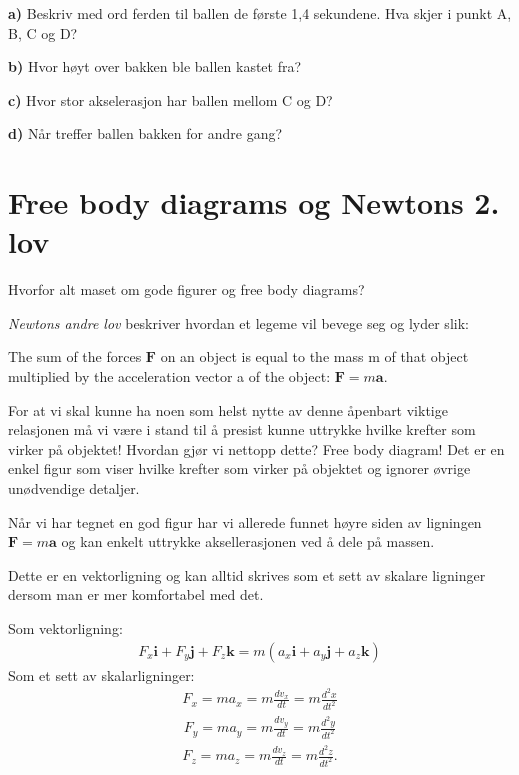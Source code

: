 \documentclass[11pt,a4paper]{article}
\numberwithin{equation}{section}
\begin{document}
\textbf{a)} Beskriv med ord ferden til ballen de første 1,4 sekundene. Hva skjer i punkt A, B, C og D?

\textbf{b)} Hvor høyt over bakken ble ballen kastet fra?

\textbf{c)} Hvor stor akselerasjon har ballen mellom C og D?

\textbf{d)} Når treffer ballen bakken for andre gang?   

\newpage

\section{Free body diagrams og Newtons 2. lov}
Hvorfor alt maset om gode figurer og free body diagrams?

\emph{Newtons andre lov} beskriver hvordan et legeme vil bevege seg og lyder slik: 

\begin{tcolorbox}
The sum of the forces $\mathbf{F}$ on an object is equal to the mass m of that object multiplied by the acceleration vector a of the object: $\mathbf{F} = m\mathbf{a}$.
\end{tcolorbox} 

For at vi skal kunne ha noen som helst nytte av denne åpenbart viktige relasjonen må vi være i stand til å presist kunne uttrykke hvilke krefter som virker på objektet! Hvordan gjør vi nettopp dette? Free body diagram! Det er en enkel figur som viser hvilke krefter som virker på objektet og ignorer øvrige unødvendige detaljer.

Når vi har tegnet en god figur har vi allerede funnet høyre siden av ligningen $\mathbf{F} = m\mathbf{a}$ og kan enkelt uttrykke aksellerasjonen ved å dele på massen. 

Dette er en vektorligning og kan alltid skrives som et sett av skalare ligninger dersom man er mer komfortabel med det.

Som vektorligning:
\begin{align*}
F_x \mathbf{i} + F_y \mathbf{j} + F_z \mathbf{k}= m( a_x \mathbf{i} + a_y \mathbf{j} + a_z \mathbf{k})
\end{align*}
Som et sett av skalarligninger:
\begin{align*}\tag{2.x}
F_x = ma_x = m \frac{dv_x}{dt} = m\frac{d^2x}{dt^2}
\end{align*}
\begin{align*}\tag{2.y}
F_y = ma_y = m \frac{dv_y}{dt} = m\frac{d^2y}{dt^2}
\end{align*}
\begin{align*}\tag{2.z}
F_z = ma_z = m \frac{dv_z}{dt} = m\frac{d^2z}{dt^2}.
\end{align*}
\end{document}
